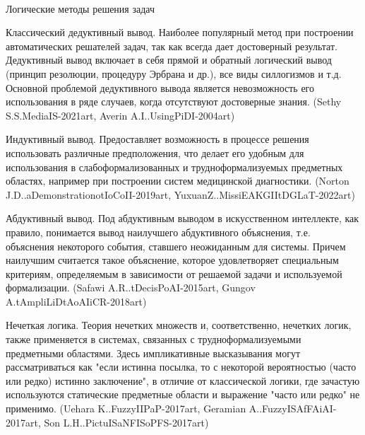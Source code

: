 \begin{frame}{\\Логические методы решения задач}
    \vspace{10mm}
    \begin{textitemize}
        \item Классический дедуктивный вывод. Наиболее популярный метод при построении автоматических решателей задач, так как всегда дает достоверный результат. Дедуктивный вывод включает в себя прямой и обратный логический вывод (принцип резолюции, процедуру Эрбрана и др.), все виды силлогизмов и т.д. Основной проблемой дедуктивного вывода является невозможность его использования в ряде случаев, когда отсутствуют достоверные знания. (Sethy S.S.MediaIS-2021art, Averin A.I..UsingPiDI-2004art)
        \item Индуктивный вывод. Предоставляет возможность в процессе решения использовать различные предположения, что делает его удобным для использования в слабоформализованных и трудноформализуемых предметных областях, например при построении систем медицинской диагностики. (Norton J.D..aDemonstrationotIoCoII-2019art, YuxuanZ..MissiEAKGIItDGLaT-2022art)
    \end{textitemize}
\end{frame}
\begin{frame}{}
    \begin{textitemize}
        \item  Абдуктивный вывод. Под абдуктивным выводом в искусственном интеллекте, как правило, понимается вывод наилучшего абдуктивного объяснения, т.е. объяснения некоторого события, ставшего неожиданным для системы. Причем наилучшим считается такое объяснение, которое удовлетворяет специальным критериям, определяемым в зависимости от решаемой задачи и используемой формализации. (Safawi A.R..tDecisPoAI-2015art, Gungov A.tAmpliLiDtAoAIiCR-2018art)
        \item Нечеткая логика. Теория нечетких множеств и, соответственно, нечетких логик, также применяется в системах, связанных с трудноформализуемыми предметными областями. Здесь импликативные высказывания могут рассматриваться как "если истинна посылка, то с некоторой вероятностью (часто или редко) истинно заключение", в отличие от классической логики, где зачастую используются статические предметные области и выражение "часто или редко" не применимо. (Uehara K..FuzzyIIPaP-2017art, Geramian A..FuzzyISAfFAiAI-2017art, Son L.H..PictuISaNFISoPFS-2017art)
    \end{textitemize}
\end{frame}
